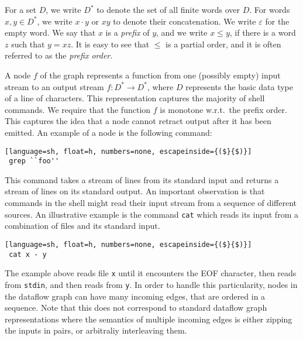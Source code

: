\documentclass[sigplan,10pt,review,anonymous]{acmart}
\newcommand{\ttt}[1]{\texttt{\small #1}}
\newcommand{\TODO}[1]{\hl{\textbf{TODO:} #1}\xspace}
\newcommand{\kstar}{^{\textstyle *}}
\newcommand{\eps}{\varepsilon}
\begin{document}
For a set $D$, we write $D\kstar$ to denote the set of all finite
words over $D$. For words $x, y \in D\kstar$, we write $x \cdot y$
or $xy$ to denote their concatenation. We write $\eps$ for the empty
word. We say that $x$ is a \emph{prefix} of $y$, and we write $x \leq y$, if there is a word $z$ such that $y = xz$. It is easy to see that $\leq$ is a partial order, and it is often referred to as the \emph{prefix order}.

A node $f$ of the graph represents a function from one (possibly empty)
input stream to an output stream $f : D\kstar \to D\kstar$, where $D$
represents the basic data type of a line of characters. This
representation captures the majority of shell commands. We require that
the function $f$ is monotone w.r.t.\ the prefix order. This captures
the idea that a node cannot retract output after it has been emitted.
An example of a node is the following command:

\begin{lstlisting}[language=sh, float=h, numbers=none, escapeinside={($}{$)}]
 grep ``foo''
\end{lstlisting}

\noindent
This command takes a stream of lines from its standard input and
returns a stream of lines on its standard output. An important
observation is that commands in the shell might read their input
stream from a sequence of different sources. An illustrative example
is the command \ttt{cat} which reads its input from a combination
of files and its standard input.

\begin{lstlisting}[language=sh, float=h, numbers=none, escapeinside={($}{$)}]
 cat x - y
\end{lstlisting}

The example above reads file \ttt{x} until it encounters the EOF
character, then reads from \ttt{stdin}, and then reads from
\ttt{y}. In order to handle this particularity, nodes in the
dataflow graph can have many incoming edges, that are ordered in a
sequence. Note that this does not correspond to standard dataflow
graph representations where the semantics of multiple incoming edges
is either zipping the inputs in pairs, or arbitraliy interleaving them.

\end{document}
